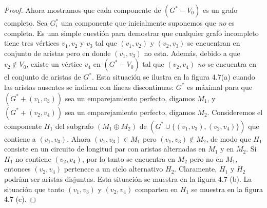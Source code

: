 \documentclass[10pt,a5paper]{book}
\begin{document}
\begin{proof}
Ahora mostramos que cada componente de $(G^* - V_0)$ es un grafo completo. Sea $G_i^*$ una componente que inicialmente suponemos que \emph{no} es completa. Es una simple cuestión para demostrar que cualquier grafo incompleto tiene tres vértices $v_1, v_2$ y $v_3$ tal que $(v_1,v_2)$ y $(v_2,v_3)$ se encuentran en conjunto de aristas pero en donde $(v_1,v_3)$ no esta. Además, debido a que $v_2 \notin V_0$, existe un vértice $v_4$ en $(G^* - V_0)$ tal que $(v_2,v_4)$ \emph{no} se encuentra en el conjunto de aristas de $G^*$. Esta situación se ilustra en la figura 4.7(a) cuando las aristas ausentes se indican con líneas discontinuas: $G^*$ es máximal para que $(G^* + (v_1,v_3))$ sea un emparejamiento perfecto, digamos $M_1$, y $(G^* + (v_2,v_4))$ sea un emparejamiento perfecto, digamos $M_2$. Consideremos el componente $H_1$ del subgrafo $(M_1 \oplus M_2)$ de $(G^* \cup \{(v_1,v_3),(v_2,v_4)\})$ que contiene a $(v_1,v_3)$. Ahora $(v_1,v_3) \in M_1$ pero $(v_1,v_3) \notin M_2$, de modo que $H_1$ consiste en un circuito de longitud par con aristas alternadas en $M_1$ y en $M_2$. Si $H_1$ no contiene $(v_2,v_4)$, por lo tanto se encuentra en $M_2$ pero no en $M_1$, entonces $(v_2,v_4)$ pertenece a un ciclo alternativo $H_2$. Claramente, $H_1$ y $H_2$ podrían ser aristas disjuntas. Esta situación se muestra en la figura 4.7 (b). La situación que tanto $(v_1,v_3)$ y $(v_2,v_4)$ comparten en $H_1$ se muestra en la figura 4.7 (c).


\end{proof}
\end{document}
